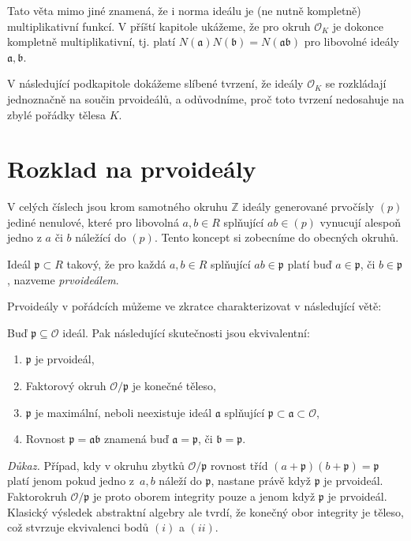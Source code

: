 \documentclass[12pt]{report}
\begin{document}
Tato věta mimo jiné znamená, že i norma ideálu je (ne nutně kompletně) multiplikativní funkcí. V příští kapitole ukážeme, že pro okruh $\mathcal{O}_K$ je dokonce kompletně multiplikativní, tj. platí $N(\mathfrak{a}) N(\mathfrak{b}) = N(\mathfrak{ab})$ pro libovolné ideály $\mathfrak{a},\mathfrak{b}$.

V následující podkapitole dokážeme slíbené tvrzení, že ideály $\mathcal{O}_K$ se rozkládají jednoznačně na součin prvoideálů, a odůvodníme, proč toto tvrzení nedosahuje na zbylé pořádky tělesa $K$.

\section{Rozklad na prvoideály}


V celých číslech jsou krom samotného okruhu $\mathbb{Z}$ ideály generované prvočísly $(p)$ jediné nenulové, které pro libovolná $a,b \in R$ splňující $ab \in (p)$ vynucují alespoň jedno z $a$ či $b$ náležící do $(p)$. Tento koncept si zobecníme do obecných okruhů.

\begin{definice}
Ideál $\mathfrak{p} \subset R$ takový, že pro každá $a,b \in R$ splňující $ab \in \mathfrak{p}$ platí buď $a \in \mathfrak{p}$, či $b \in \mathfrak{p}$, nazveme \textit{prvoideálem}.
\end{definice}

Prvoideály v pořádcích můžeme ve zkratce charakterizovat v následující větě:
\begin{veta}\label{prvoid}
Buď $\mathfrak{p} \subseteq \mathcal{O}$ ideál. Pak následující skutečnosti jsou ekvivalentní:
\begin{enumerate}
\item $\mathfrak{p}$ je prvoideál,
\item Faktorový okruh $\mathcal{O}/\mathfrak{p}$ je konečné těleso,
\item $\mathfrak{p}$ je maximální, neboli neexistuje ideál $\mathfrak{a}$ splňující $\mathfrak{p} \subset \mathfrak{a} \subset \mathcal{O}$,
\item Rovnost $\mathfrak{p} = \mathfrak{a} \mathfrak{b}$ znamená buď $\mathfrak{a} = \mathfrak{p}$, či $\mathfrak{b} = \mathfrak{p}$.
\end{enumerate} 
\end{veta}
\textit{Důkaz.} Případ, kdy v okruhu zbytků $\mathcal{O}/\mathfrak{p}$ rovnost tříd $(a+\mathfrak{p})(b+\mathfrak{p}) = \mathfrak{p}$ platí jenom pokud jedno z~$a,b$ náleží do $\mathfrak{p}$, nastane právě když $\mathfrak{p}$ je prvoideál. Faktorokruh $\mathcal{O}/\mathfrak{p}$ je proto oborem integrity pouze a jenom když $\mathfrak{p}$ je prvoideál. Klasický výsledek abstraktní algebry ale tvrdí, že konečný obor integrity je těleso, což stvrzuje ekvivalenci bodů $(i)$ a $(ii)$.
\end{document}
